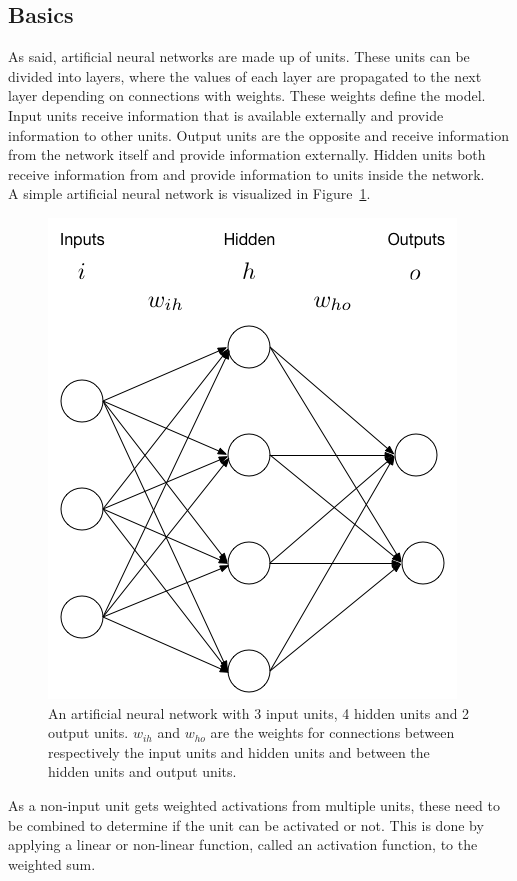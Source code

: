 \subsection{Basics} %
\label{sub:basics}
As said, artificial neural networks are made up of units. These units can be divided into layers, where the values of each layer are propagated to the next layer depending on connections with weights. These weights define the model.
Input units receive information that is available externally and provide information to other units. Output units are the opposite and receive information from the network itself and provide information externally. Hidden units both receive information from and provide information to units inside the network.\\
A simple artificial neural network is visualized in Figure~\ref{fig:ann}.\\
\begin{figure}[htb]
    \centering
    \includegraphics[width=.7\linewidth]{images/ann.png}
    \caption[An artificial neural network]{An artificial neural network with 3 input units, 4 hidden units and 2 output units. $w_{ih}$ and $w_{ho}$ are the weights for connections between respectively the input units and hidden units and between the hidden units and output units.}
    \label{fig:ann}
\end{figure}
As a non-input unit gets weighted activations from multiple units, these need to be combined to determine if the unit can be activated or not. This is done by applying a linear or non-linear function, called an activation function, to the weighted sum.

